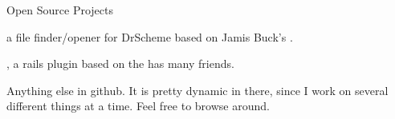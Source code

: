 \begin{rubric}{Open Source Projects}{ 

    \entry* 
        \textbf{} a
        file finder/opener for DrScheme based on Jamis Buck's
        .

    \entry* 
        \textbf{}, a rails
        plugin based on the has many friends. 
        

    \entry*
        Anything else in github. It is pretty dynamic in there, since I work on
        several different things at a time. Feel free to browse around.
        

}\end{rubric}
